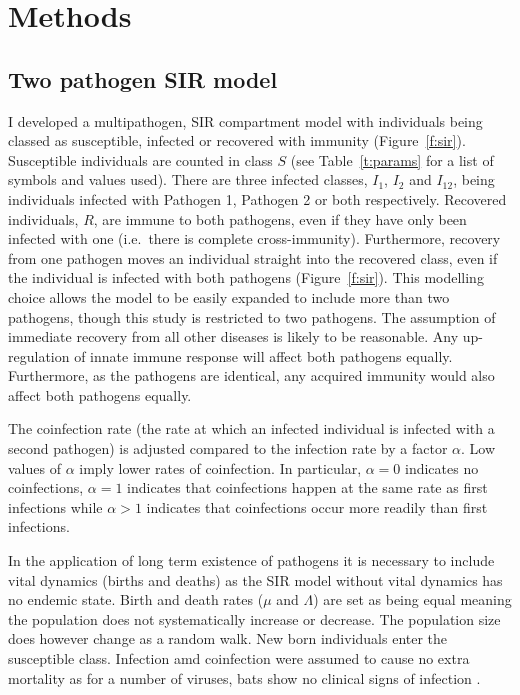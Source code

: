 
\section{Methods}




\subsection{Two pathogen SIR model}

I developed a multipathogen, SIR compartment model with individuals being classed as susceptible, infected or recovered with immunity (Figure~\ref{f:sir}).
Susceptible individuals are counted in class $S$ (see Table~\ref{t:params} for a list of symbols and values used).
There are three infected classes, $I_1$, $I_2$ and $I_{12}$, being individuals infected with Pathogen 1, Pathogen 2 or both respectively.
Recovered individuals, $R$, are immune to both pathogens, even if they have only been infected with one (i.e.\ there is complete cross-immunity).
Furthermore, recovery from one pathogen moves an individual straight into the recovered class, even if the individual is infected with both pathogens (Figure~\ref{f:sir}).
This modelling choice allows the model to be easily expanded to include more than two pathogens, though this study is restricted to two pathogens.
The assumption of immediate recovery from all other diseases is likely to be reasonable.
Any up-regulation of innate immune response will affect both pathogens equally.
Furthermore, as the pathogens are identical, any acquired immunity would also affect both pathogens equally.

The coinfection rate (the rate at which an infected individual is infected with a second pathogen) is adjusted compared to the infection rate by a factor $\alpha$.
Low values of $\alpha$ imply lower rates of coinfection.
In particular, $\alpha = 0$ indicates no coinfections, $\alpha = 1$ indicates that coinfections happen at the same rate as first infections while $\alpha > 1$ indicates that coinfections occur more readily than first infections.


In the application of long term existence of pathogens it is necessary to include vital dynamics (births and deaths) as the SIR model without vital dynamics has no endemic state.
Birth and death rates ($\mu$ and $\Lambda$) are set as being equal meaning the population does not systematically increase or decrease.
The population size does however change as a random walk.
New born individuals enter the susceptible class.
Infection amd coinfection were assumed to cause no extra mortality as for a number of viruses, bats show no clinical signs of infection \cite{halpin2011pteropid, deThoisy2016bioecological}.

